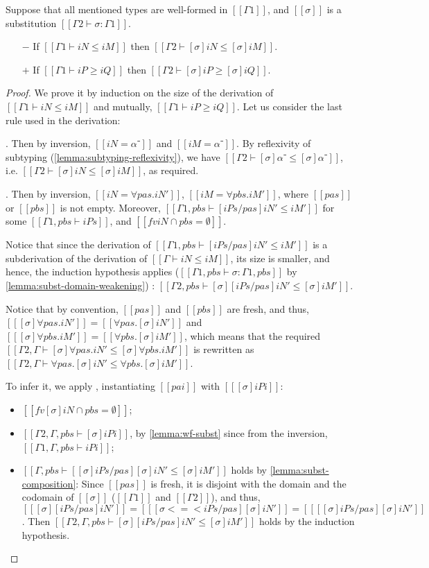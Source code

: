 \begin{lemma}
  \label{lemma:subst-pres-subt}
  Suppose that all mentioned types are well-formed in $[[Γ1]]$,
  and $[[σ]]$ is a substitution $[[Γ2 ⊢ σ : Γ1]]$.
  \begin{itemize}
    \item [$-$] If $[[Γ1 ⊢ iN ≤ iM]]$ then $[[Γ2 ⊢ [σ]iN ≤ [σ]iM]]$.
    \item [$+$] If $[[Γ1 ⊢ iP ≥ iQ]]$ then $[[Γ2 ⊢ [σ]iP ≥ [σ]iQ]]$.
  \end{itemize}
\end{lemma}
\begin{proof}
  We prove it by induction on the size of the derivation of $[[Γ1 ⊢ iN ≤ iM]]$
  and mutually, $[[Γ1 ⊢ iP ≥ iQ]]$. Let us consider the last rule 
  used in the derivation:
  \begin{caseof}
    \item {}. Then by inversion, 
      $[[iN = α⁻]]$ and $[[iM = α⁻]]$. By reflexivity of subtyping
      (\cref{lemma:subtyping-reflexivity}),
      we have $[[Γ2 ⊢ [σ]α⁻ ≤ [σ]α⁻]]$, i.e. $[[Γ2 ⊢ [σ]iN ≤ [σ]iM]]$,
      as required.
    \item  {}. Then by inversion,
      $[[iN = ∀pas.iN']]$, $[[iM = ∀pbs.iM']]$, where $[[pas]]$ or $[[pbs]]$ is not empty.
      Moreover, $[[Γ1, pbs ⊢ [iPs/pas]iN' ≤ iM']]$ for some $[[Γ1, pbs ⊢ iPs]]$, and 
      $[[fv iN ∩ {pbs} = ∅ ]]$.

      Notice that since the derivation of $[[Γ1, pbs ⊢ [iPs/pas]iN' ≤ iM']]$ is
      a subderivation of the derivation of $[[Γ ⊢ iN ≤ iM]]$, its size is smaller, 
      and hence, the induction hypothesis applies
      ($[[Γ1, pbs ⊢ σ : Γ1, pbs]]$ by \cref{lemma:subst-domain-weakening})
      :
      $[[Γ2, pbs ⊢ [σ][iPs/pas]iN' ≤ [σ]iM']]$.

      Notice that by convention, $[[pas]]$ and $[[pbs]]$ are fresh, and thus,  
      $[[ [σ]∀pas.iN' ]] = [[ ∀pas.[σ]iN' ]]$ and $[[ [σ]∀pbs.iM' ]] = [[ ∀pbs.[σ]iM' ]]$, 
      which means that the required $[[Γ2, Γ ⊢ [σ]∀pas.iN' ≤ [σ]∀pbs.iM']]$ is rewritten as
      $[[Γ2 , Γ ⊢ ∀pas.[σ]iN' ≤ ∀pbs.[σ]iM']]$.

      To infer it, we apply , 
      instantiating $[[pai]]$ with $[[ [σ]iPi ]]$:
      \begin{itemize}
        \item $[[fv [σ]iN ∩ {pbs} = ∅ ]]$;
        \item $[[Γ2, Γ,pbs⊢ [σ]iPi]]$, by \cref{lemma:wf-subst} since from the inversion,
          $[[Γ1, Γ, pbs ⊢ iPi]]$;
        \item $[[Γ, pbs ⊢ [ [σ]iPs/pas ][σ]iN' ≤ [σ]iM']]$ holds
          by \cref{lemma:subst-composition}:
          Since $[[pas]]$ is fresh, it is disjoint with the domain and the codomain of $[[σ]]$
          ($[[Γ1]]$ and $[[Γ2]]$), and thus, 
          $[[ [σ][iPs/pas]iN' ]] = [[ [ σ <=< iPs/pas ][σ]iN' ]] = [[ [ [σ]iPs/pas ][σ]iN' ]]$.
          Then $[[Γ2, Γ, pbs ⊢ [σ][iPs/pas]iN' ≤ [σ]iM']]$ holds by the induction hypothesis.
      \end{itemize}


\end{caseof}
\end{proof}
